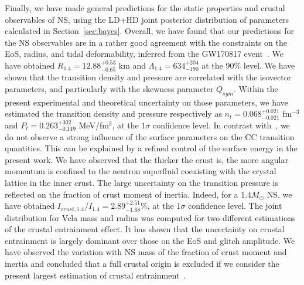 Finally, we have made general predictions for the static properties and crustal 
observables of NS, using the LD+HD joint posterior distribution of parameters 
calculated in Section~\ref{sec:bayes}. Overall, we have found that our 
predictions for the NS observables are in a rather good agreement with the
constraints on the EoS, radius, and tidal deformability, inferred from the 
GW170817 event~\cite{De2018,GW1}. We have obtained 
$R_{1.4}=12.88_{-0.65}^{+0.53}$ km and $\Lambda_{1.4} = 634_{-190}^{+204}$ at 
the $90\%$ level. 
We have shown that the transition density and pressure are 
correlated with the isovector parameters, and particularly with the skewness 
parameter $Q_{sym}$. Within the present experimental and theoretical 
uncertainty on those parameters, we have estimated the transition density and
pressure respectively as $n_t=0.068_{-0.021}^{+0.021}$ fm$^{-3}$ and
$P_t=0.263_{-0.149}^{+302}$ MeV/fm$^3$, at the $1\sigma$ confidence level. In
contrast with~\cite{Carreau2019cc}, we do not observe a strong influence of
the surface parameters on the CC transition quantities. This can be explained 
by a refined control of the surface energy in the present work.
We have observed that the thicker the crust is, the more angular momentum is
confined to the neutron superfluid coexisting with the crystal lattice in the
inner crust. The large uncertainty on the transition pressure is reflected on
the fraction of crust moment of inertia. Indeed, for a $1.4M_\odot$ NS, we have 
obtained $I_{crust,1.4}/I_{1.4}=2.89_{-1.68}^{+2.51} \%$, at the $1\sigma$ 
confidence level. The joint distribution for Vela mass and radius was
computed for two different estimations of the crustal entrainment effect. It 
has shown that the uncertainty on crustal entrainment is largely dominant over 
those on the EoS and glitch amplitude. We have observed the variation with NS
mass of the fraction of crust moment and inertia and concluded that a full 
crustal origin is excluded if we consider the present largest estimation of 
crustal entrainment~\cite{Delsate2016}.

\clearpage\thispagestyle{empty}
